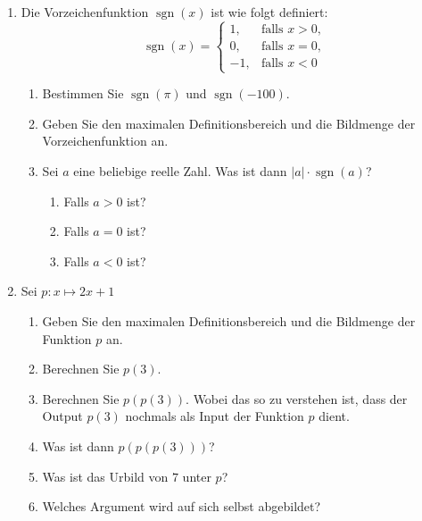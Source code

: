 \begin{enumerate}
    \item \label{aufgabe:vorzeichenfunktion}Die Vorzeichenfunktion \( \operatorname{sgn}(x) \) ist wie folgt definiert:
          \[
              \operatorname{sgn}(x) =
              \begin{cases}
                  1,  & \text{falls } x > 0, \\
                  0,  & \text{falls } x = 0, \\
                  -1, & \text{falls } x < 0
              \end{cases}
          \]
          \begin{enumerate}[label=\alph*)]
              \item Bestimmen Sie \( \operatorname{sgn}(\pi) \) und \( \operatorname{sgn}(-100) \).
              \item Geben Sie den maximalen Definitionsbereich und die Bildmenge der Vorzeichenfunktion an.
              \item Sei \( a \) eine beliebige reelle Zahl. Was ist dann \( |a| \cdot \operatorname{sgn}(a) \)?
                    \begin{enumerate}[label=\roman*)]
                        \item Falls \( a > 0 \) ist? \\
                        \item Falls \( a = 0 \) ist? \\
                        \item Falls \( a < 0 \) ist?
                    \end{enumerate}
          \end{enumerate}

    \item Sei \( p: x \mapsto 2x + 1 \)
          \begin{enumerate}[label=\alph*)]
              \item Geben Sie den maximalen Definitionsbereich und die Bildmenge der Funktion \( p \) an.
              \item Berechnen Sie \( p(3) \).
              \item Berechnen Sie \( p(p(3)) \). Wobei das so zu verstehen ist, dass der Output \( p(3) \) nochmals als Input der Funktion \( p \) dient.
              \item Was ist dann \( p(p(p(3))) \)?
              \item Was ist das Urbild von \( 7 \) unter \( p \)?
              \item Welches Argument wird auf sich selbst abgebildet?
          \end{enumerate}


\end{enumerate}
